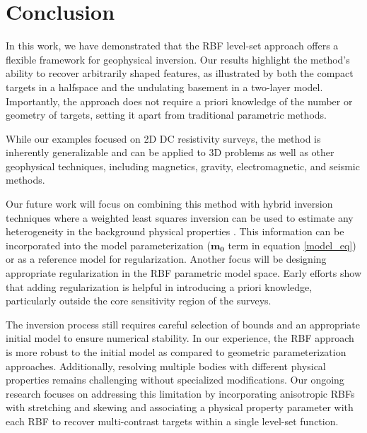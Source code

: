 \documentclass{segabs}
\begin{document}
\vspace{-0.45cm}
\section{Conclusion}
\vspace{-0.25cm}

In this work, we have demonstrated that the RBF level-set approach offers a flexible framework for geophysical inversion. Our results highlight the method’s ability to recover arbitrarily shaped features, as illustrated by both the compact targets in a halfspace and the undulating basement in a two-layer model. Importantly, the approach does not require a priori knowledge of the number or geometry of targets, setting it apart from traditional parametric methods. 

While our examples focused on 2D DC resistivity surveys, the method is inherently generalizable and can be applied to 3D problems as well as other geophysical techniques, including magnetics, gravity, electromagnetic, and seismic methods.

Our future work will focus on combining this method with hybrid inversion techniques where a weighted least squares inversion can be used to estimate any heterogeneity in the background physical properties \citep{belliveau_parametric_2023}. This information can be incorporated into the model parameterization ($\mathbf{m_0}$ term in equation \ref{model_eq}) or as a reference model for regularization. Another focus will be designing appropriate regularization in the RBF parametric model space. Early efforts show that adding regularization is helpful in introducing a priori knowledge, particularly outside the core sensitivity region of the surveys. 

The inversion process still requires careful selection of bounds and an appropriate initial model to ensure numerical stability. In our experience, the RBF approach is more robust to the initial model as compared to geometric parameterization approaches. Additionally, resolving multiple bodies with different physical properties remains challenging without specialized modifications. Our ongoing research focuses on addressing this limitation by incorporating anisotropic RBFs with stretching and skewing \citep{ozsar_parametric_2025} and associating a physical property parameter with each RBF to recover multi-contrast targets within a single level-set function.

\onecolumn


\end{document}
